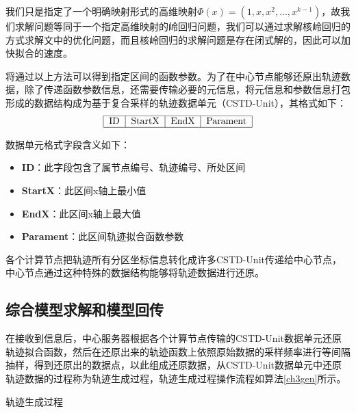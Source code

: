 我们只是指定了一个明确映射形式的高维映射$\varPhi \left( x \right) =\left( 1,x,x^2,...,x^{k-1} \right) $，故我们求解问题等同于一个指定高维映射的岭回归问题，我们可以通过求解核岭回归的方式求解文中的优化问题，而且核岭回归的求解问题是存在闭式解的，因此可以加快拟合的速度。

将通过以上方法可以得到指定区间的函数参数。为了在中心节点能够还原出轨迹数据，除了传递函数参数信息，还需要传输必要的元信息，将元信息和参数信息打包形成的数据结构成为基于复合采样的轨迹数据单元（CSTD-Unit），其格式如下：
$$
\begin{tabular}{|c|c|c|c|}
\hline ID&StartX&EndX&Parament\\
\hline
\end{tabular}
$$

数据单元格式字段含义如下：
\begin{itemize}
\item \textbf{ID}：此字段包含了属节点编号、轨迹编号、所处区间
\item \textbf{StartX}：此区间x轴上最小值
\item \textbf{EndX}：此区间x轴上最大值
\item \textbf{Parament}：此区间轨迹拟合函数参数
\end{itemize}

各个计算节点把轨迹所有分区坐标信息转化成许多CSTD-Unit传递给中心节点，中心节点通过这种特殊的数据结构能够将轨迹数据进行还原。

\subsection{综合模型求解和模型回传}

在接收到信息后，中心服务器根据各个计算节点传输的CSTD-Unit数据单元还原轨迹拟合函数，然后在还原出来的轨迹函数上依照原始数据的采样频率进行等间隔抽样，得到还原出的数据点，以此组成还原数据，从CSTD-Unit数据单元中还原轨迹数据的过程称为轨迹生成过程，轨迹生成过程操作流程如算法\ref{ch3gen}所示。
\begin{algorithm}[H]
	\label{ch3gen}
	 \caption{轨迹生成过程}
\end{algorithm}

